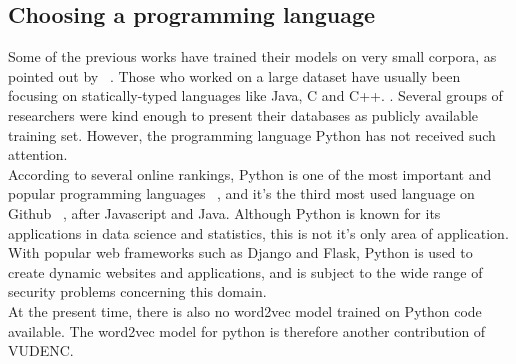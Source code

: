 \documentclass[
	a4paper,
	pagesize,
	pdftex,
	12pt,
	twoside, %
	BCOR=5mm, %
	ngerman,
	fleqn,
	final,
	]{scrartcl}
\begin{document}
\subsection{Choosing a programming language}
Some of the previous works have trained their models on very small corpora, as pointed out by ~\cite{Bhoopchand.2016}. Those who worked on a large dataset have usually been focusing on statically-typed languages like Java, C and C++. \cite{Bellon.2007,Russell.2018,Liu.2018,Dam.2017, Rolim.2018}. Several groups of researchers were kind enough to present their databases as publicly available training set. However, the programming language Python has not received such attention. \\
According to several online rankings, Python is one of the most important and popular programming languages ~\cite{AyeshaCuthbert.15.4.2019, VidushiDwivedi.}, and it's the third most used language on Github ~\cite{Github.com.19}, after Javascript and Java. Although Python is known for its applications in data science and statistics, this is not it's only area of application. With popular web frameworks such as Django and Flask, Python is used to create dynamic websites and applications, and is subject to the wide range of security problems concerning this domain.\\
At the present time, there is also no word2vec model trained on Python code available. The word2vec model for python is therefore  another contribution of VUDENC.\\
\end{document}
